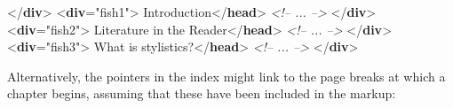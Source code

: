 \begin{shaded}
\hspace*{1em}\hspace*{1em}\hspace*{1em}\mbox{}\newline 
\hspace*{1em}\hspace*{1em}\mbox{}\newline 
\hspace*{1em}\mbox{}\newline 
{}\mbox{}\newline 
{</\textbf{div}>}\mbox{}\newline 
{<\textbf{div}\hspace*{1em}{xml:id}="{fish1}">}\mbox{}\newline 
{}Introduction{</\textbf{head}>}\mbox{}\newline 
\textit{<!-- ... -->}\mbox{}\newline 
{</\textbf{div}>}\mbox{}\newline 
{<\textbf{div}\hspace*{1em}{xml:id}="{fish2}">}\mbox{}\newline 
{}Literature in the Reader{</\textbf{head}>}\mbox{}\newline 
\textit{<!-- ... -->}\mbox{}\newline 
{</\textbf{div}>}\mbox{}\newline 
{<\textbf{div}\hspace*{1em}{xml:id}="{fish3}">}\mbox{}\newline 
{}What is stylistics?{</\textbf{head}>}\mbox{}\newline 
\textit{<!-- ... -->}\mbox{}\newline 
{</\textbf{div}>}\end{shaded}\egroup\par \noindent  Alternatively, the pointers in the index might link to the page breaks at which a chapter begins, assuming that these have been included in the markup: \par\bgroup{}\exampleFont \begin{shaded}\noindent\mbox{}\mbox{}\newline 

\end{shaded}
